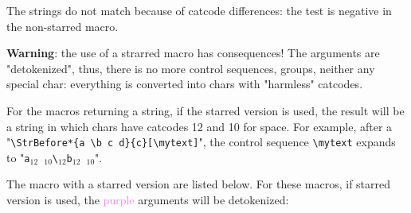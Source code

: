 \documentclass[english,a4paper,10pt]{article}
\newcommand\guill[1]{"#1"}
\newcommand\verbinline{\lstinline[basicstyle=\normalsize\ttfamily]}
\begin{document}
The strings do not match because of catcode differences: the test is negative in the non-starred macro.\bigskip

\textbf{Warning}: the use of a strarred macro has consequences! The arguments are \guill{detokenized}, thus, there is no more control sequences, groups, neither any special char: everything is converted into chars with "harmless" catcodes.\medskip

For the macros returning a string, if the starred version is used, the result will be a string in which chars have catcodes 12 and 10 for space. For example, after a "\verbinline|\StrBefore*{a \b c d}{c}[\mytext]|", the control sequence \verb|\mytext| expands to "\verb|a|${}_{12}$\verb*| |${}_{10}$\verb|\|${}_{12}$\verb|b|${}_{12}$\verb*| |${}_{10}$".\medskip

The macro with a starred version are listed below. For these macros, if starred version is used, the \textcolor{violet}{purple} arguments will be detokenized:\smallskip
\end{document}
